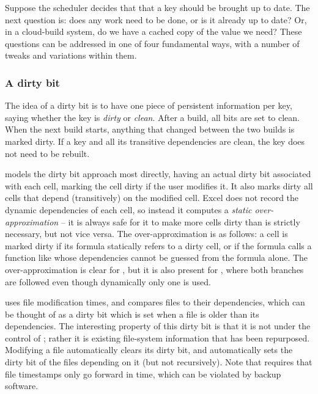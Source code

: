 Suppose the scheduler decides that that a key should be brought up to date. The
next question is: does any work need to be done, or is it already up to date?
Or, in a cloud-build system, do we have a cached copy of the value we need?
These questions can be addressed in one of four fundamental ways, with a number
of tweaks and variations within them.

\vspace{-2mm}
\subsubsection{A dirty bit}\label{sec-dirty-bit}

The idea of a dirty bit is to have one piece of persistent information per key,
saying whether the key is \emph{dirty} or \emph{clean}. After a build, all bits
are set to clean. When the next build starts, anything that changed between the
two builds is marked dirty. If a key and all its transitive dependencies are
clean, the key does not need to be rebuilt.

\Excel models the dirty bit approach most directly, having an actual dirty bit
associated with each cell, marking the cell dirty if the user modifies it.
It also marks dirty all cells that depend (transitively) on the modified cell.
Excel does not record the dynamic dependencies of each cell,
so instead it computes a \emph{static over-approximation} -- it is always
safe for it to make more cells dirty than is strictly necessary, but not
vice versa.  The over-approximation is as follows: a cell is marked dirty
if its formula statically refers to a dirty cell, or if
the formula calls a function like  whose dependencies cannot be
guessed from the formula alone.  The over-approximation is clear for ,
but it is also present for , where both branches are followed even though
dynamically only one is used.

\Make uses file modification times, and compares files to their dependencies,
which can be thought of as a dirty bit which is set when a file is older than
its dependencies. The interesting property of this dirty bit is that it is not
under the control of \Make; rather it is existing file-system information that
has been repurposed. Modifying a file automatically clears its dirty bit, and
automatically sets the dirty bit of the files depending on it (but not
recursively). Note that \Make requires that file timestamps only go forward in
time, which can be violated by backup software.

